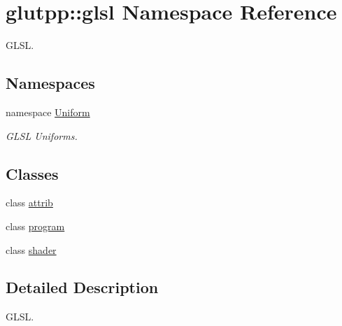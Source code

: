 \hypertarget{namespaceglutpp_1_1glsl}{\section{glutpp\-:\-:glsl \-Namespace \-Reference}
\label{namespaceglutpp_1_1glsl}
}


\-G\-L\-S\-L.  


\subsection*{\-Namespaces}
\begin{DoxyCompactItemize}
\item 
namespace \hyperlink{namespaceglutpp_1_1glsl_1_1Uniform}{\-Uniform}
\begin{DoxyCompactList}\small\item\em \-G\-L\-S\-L \-Uniforms. \end{DoxyCompactList}\end{DoxyCompactItemize}
\subsection*{\-Classes}
\begin{DoxyCompactItemize}
\item 
class \hyperlink{classglutpp_1_1glsl_1_1attrib}{attrib}
\item 
class \hyperlink{classglutpp_1_1glsl_1_1program}{program}
\item 
class \hyperlink{classglutpp_1_1glsl_1_1shader}{shader}
\end{DoxyCompactItemize}


\subsection{\-Detailed \-Description}
\-G\-L\-S\-L. 